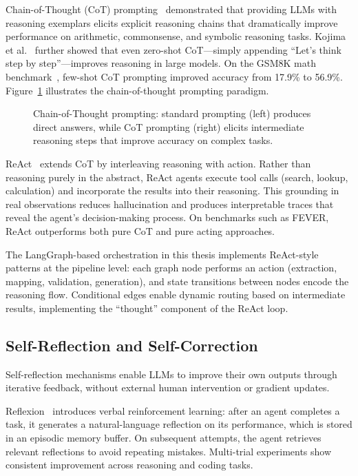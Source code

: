 Chain-of-Thought (CoT) prompting~\cite{wei2022chainofthoughtpromptingelicitsreasoning} demonstrated that providing LLMs with reasoning exemplars elicits explicit reasoning chains that dramatically improve performance on arithmetic, commonsense, and symbolic reasoning tasks. Kojima et al.~\cite{kojima2022largelanguagemodelszeroshotreasoners} further showed that even zero-shot CoT---simply appending ``Let's think step by step''---improves reasoning in large models. On the GSM8K math benchmark~\cite{cobbe2021gsm8k}, few-shot CoT prompting improved accuracy from 17.9\% to 56.9\%. Figure~\ref{fig:cot} illustrates the chain-of-thought prompting paradigm.

\begin{figure}[htbp]
\centering
{}
\caption{Chain-of-Thought prompting: standard prompting (left) produces direct answers, while CoT prompting (right) elicits intermediate reasoning steps that improve accuracy on complex tasks.}
\label{fig:cot}
\end{figure}

ReAct~\cite{yao2023reactsynergizingreasoningacting} extends CoT by interleaving reasoning with action. Rather than reasoning purely in the abstract, ReAct agents execute tool calls (search, lookup, calculation) and incorporate the results into their reasoning. This grounding in real observations reduces hallucination and produces interpretable traces that reveal the agent's decision-making process. On benchmarks such as FEVER, ReAct outperforms both pure CoT and pure acting approaches.

The LangGraph-based orchestration in this thesis implements ReAct-style patterns at the pipeline level: each graph node performs an action (extraction, mapping, validation, generation), and state transitions between nodes encode the reasoning flow. Conditional edges enable dynamic routing based on intermediate results, implementing the ``thought'' component of the ReAct loop.

\subsection{Self-Reflection and Self-Correction}
\label{sec:rw:self_reflection}

Self-reflection mechanisms enable LLMs to improve their own outputs through iterative feedback, without external human intervention or gradient updates.

Reflexion~\cite{shinn2023reflexionlanguageagentsverbal} introduces verbal reinforcement learning: after an agent completes a task, it generates a natural-language reflection on its performance, which is stored in an episodic memory buffer. On subsequent attempts, the agent retrieves relevant reflections to avoid repeating mistakes. Multi-trial experiments show consistent improvement across reasoning and coding tasks.

